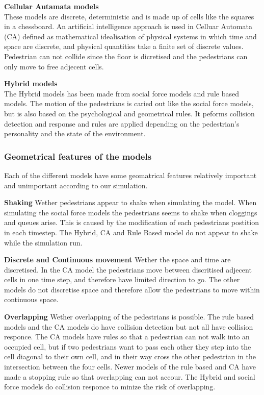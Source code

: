 \textbf{Cellular Autamata models}\\
These models are discrete, deterministic and is made up of cells like the squares in a chessboard.
An artificial intelligence approach is used in Celluar Automata (CA) defined as mathematical idealisation 
of physical systems in which time and space are discrete, and physical quantities take a finite set of 
discrete values. Pedestrian can not collide since the floor is dicretised and the pedestrians can
only move to free adjecent cells.\cite{Comparison}

\textbf{Hybrid models}\\
The Hybrid models has been made from social force models and rule based models. 
The motion of the pedestrians is caried out like the social force models, but is also based 
on the psychological and geometrical rules. It peforms collision detection and response and rules 
are applied depending on the pedestrian's personality and the state of the environment. 
\cite{Comparison}
\\

\subsubsection{Geometrical features of the models}
Each of the different models have some geomatrical features relatively important and 
unimportant according to our simulation.

\textbf{Shaking} Wether pedestrians appear to shake when simulating the model. When 
simulating the social force models the pedestrians seems to shake when cloggings and 
queues arise. This is caused by the modification of each pedestrians postition in each 
timestep. The Hybrid, CA and Rule Based model do not appear to shake while the simulation run.

\textbf{Discrete and Continuous movement} Wether the space and time are discretised. In the CA model the pedestrians move between discritised adjecent
cells in one time step, and therefore have limited direction to go. The other models do not discretise space and therefore allow the pedestrians to move
within continuous space.
 
\textbf{Overlapping} Wether overlapping of the pedestrians is possible. The rule based models and the CA models do have collision detection but not
all have collision responce. The CA models have rules so that a pedestrian can not walk into an occupied cell, but if two pedestrians want to pass each
other they step into the cell diagonal to their own cell, and in their way cross the other pedestrian in the intersection between the four cells.
Newer models of the rule based and CA have made a stopping rule so that overlapping can not accour. The Hybrid and social force models do collision responce
to minize the risk of overlapping. \cite{Comparison}

